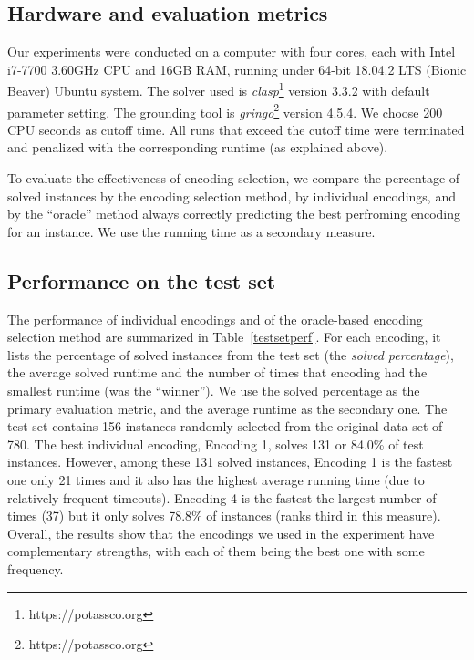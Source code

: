 \documentclass{new_tlp}
\begin{document}
\subsection{Hardware and evaluation metrics }\label{metrics}
Our experiments were conducted on a computer with four cores, each with
Intel i7-7700 3.60GHz CPU and 16GB RAM, running under 64-bit 18.04.2 LTS 
(Bionic Beaver) Ubuntu system. The solver used is 
\emph{clasp}\footnote{https://potassco.org} version
3.3.2 with default parameter setting. The grounding tool 
is \emph{gringo}\footnote{https://potassco.org} version 4.5.4. We choose 
200 CPU seconds as 
cutoff time. All runs that exceed the cutoff time were terminated and penalized 
with the corresponding runtime (as explained above).

To evaluate the effectiveness of encoding selection, we compare the percentage 
of solved instances by the encoding selection method, by individual encodings,
and by the ``oracle'' method always correctly predicting the best perfroming 
encoding for an instance. We use the running time as a secondary measure.


\subsection{Performance on the test set}

The performance of individual encodings and of the oracle-based encoding
selection method are summarized in Table~\ref{testsetperf}. For each encoding,
it lists the percentage of solved instances from the test set (the \emph{solved
percentage}), the average solved runtime and the number of times that encoding 
had the smallest runtime (was the ``winner''). We use the solved percentage 
as the primary evaluation metric, and the average runtime as the secondary 
one. The test set contains 156 instances randomly selected from the original 
data set of 780. The best individual encoding, Encoding 1, solves 131 or 
84.0\% of test instances. However, among these 131 solved instances, 
Encoding 1 is the fastest one only 21 times and it also has the highest 
average running time (due to relatively frequent timeouts). Encoding 4 is 
the fastest the largest number of times (37) but it only solves 78.8\% 
of instances (ranks third in this measure). Overall, the results show that 
the encodings we used in the experiment have complementary strengths, with 
each of them being the best one with some frequency.
\end{document}

